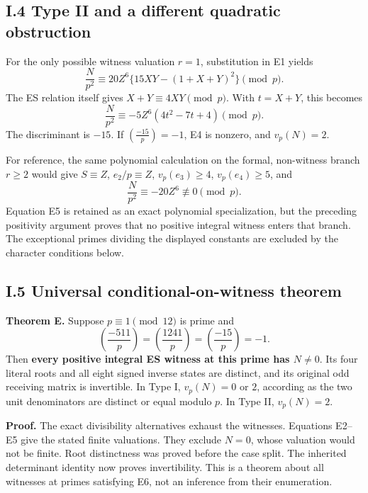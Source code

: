 \subsection{I.4 Type II and a different quadratic
obstruction}\label{i.4-type-ii-and-a-different-quadratic-obstruction}

For the only possible witness valuation \(r=1\), substitution in E1
yields \[
\frac{N}{p^2}\equiv
20Z^6\{15XY-(1+X+Y)^2\}\pmod p.
\] The ES relation itself gives \(X+Y\equiv4XY\pmod p\). With \(t=X+Y\),
this becomes \[
\frac{N}{p^2}\equiv-5Z^6(4t^2-7t+4)\pmod p.
\tag{E4}
\] The discriminant is \(-15\). If \(\left(\frac{-15}{p}\right)=-1\), E4
is nonzero, and \(v_p(N)=2\).

For reference, the same polynomial calculation on the formal,
non-witness branch \(r\ge2\) would give \(S\equiv Z\),
\(e_2/p\equiv Z\), \(v_p(e_3)\ge4\), \(v_p(e_4)\ge5\), and \[
\frac{N}{p^2}\equiv-20Z^6\not\equiv0\pmod p.
\tag{E5}
\] Equation E5 is retained as an exact polynomial specialization, but
the preceding positivity argument proves that no positive integral
witness enters that branch. The exceptional primes dividing the
displayed constants are excluded by the character conditions below.

\subsection{I.5 Universal conditional-on-witness
theorem}\label{i.5-universal-conditional-on-witness-theorem}

\textbf{Theorem E.} Suppose \(p\equiv1\pmod{12}\) is prime and \[
\boxed{
\left(\frac{-511}{p}\right)=
\left(\frac{1241}{p}\right)=
\left(\frac{-15}{p}\right)=-1.
}
\tag{E6}
\] Then \textbf{every positive integral ES witness at this prime has
\(N\ne0\)}. Its four literal roots and all eight signed inverse states
are distinct, and its original odd receiving matrix is invertible. In
Type I, \(v_p(N)=0\) or \(2\), according as the two unit denominators
are distinct or equal modulo \(p\). In Type II, \(v_p(N)=2\).

\textbf{Proof.} The exact divisibility alternatives exhaust the
witnesses. Equations E2--E5 give the stated finite valuations. They
exclude \(N=0\), whose valuation would not be finite. Root distinctness
was proved before the case split. The inherited determinant identity now
proves invertibility. This is a theorem about all witnesses at primes
satisfying E6, not an inference from their enumeration.

